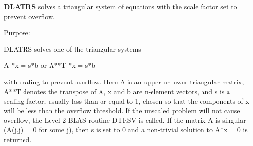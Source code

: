 {\bfseries D\+L\+A\+T\+R\+S} solves a triangular system of equations with the scale factor set to prevent overflow. 

 \begin{DoxyParagraph}{Purpose\+: }
\begin{DoxyVerb} DLATRS solves one of the triangular systems

    A *x = s*b  or  A**T *x = s*b

 with scaling to prevent overflow.  Here A is an upper or lower
 triangular matrix, A**T denotes the transpose of A, x and b are
 n-element vectors, and s is a scaling factor, usually less than
 or equal to 1, chosen so that the components of x will be less than
 the overflow threshold.  If the unscaled problem will not cause
 overflow, the Level 2 BLAS routine DTRSV is called.  If the matrix A
 is singular (A(j,j) = 0 for some j), then s is set to 0 and a
 non-trivial solution to A*x = 0 is returned.\end{DoxyVerb}
 
\end{DoxyParagraph}

